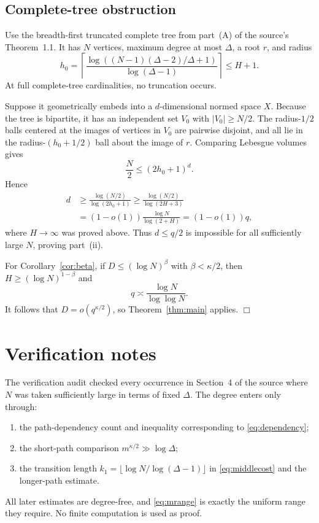\documentclass[11pt]{article}
\begin{document}
\subsection*{Complete-tree obstruction}

Use the breadth-first truncated complete tree from part~(A) of the source's
Theorem~1.1. It has $N$ vertices, maximum degree at most $\Delta$, a root $r$,
and radius
\[
 h_0=\left\lceil
 \frac{\log\left((N-1)(\Delta-2)/\Delta+1\right)}{\log(\Delta-1)}
 \right\rceil\leq H+1.
\]
At full complete-tree cardinalities, no truncation occurs.

Suppose it geometrically embeds into a $d$-dimensional normed space $X$.
Because the tree is bipartite, it has an independent set $V_0$ with
$|V_0|\geq N/2$. The radius-$1/2$ balls centered at the images of vertices in
$V_0$ are pairwise disjoint, and all lie in the radius-$(h_0+1/2)$ ball about
the image of $r$. Comparing Lebesgue volumes gives
\[
 \frac N2\leq(2h_0+1)^d.
\]
Hence
\begin{align*}
 d&\geq\frac{\log(N/2)}{\log(2h_0+1)}
 \geq\frac{\log(N/2)}{\log(2H+3)}\\
  &=(1-o(1))\frac{\log N}{\log(2+H)}=(1-o(1))q,
\end{align*}
where $H\to\infty$ was proved above. Thus $d\leq q/2$ is impossible for all
sufficiently large $N$, proving part~(ii).

For Corollary~\ref{cor:beta}, if
$D\leq(\log N)^\beta$ with $\beta<\kappa/2$, then
$H\geq(\log N)^{1-\beta}$ and
\[
 q\asymp\frac{\log N}{\log\log N}.
\]
It follows that $D=o(q^{\kappa/2})$, so Theorem~\ref{thm:main} applies.
\hfill$\Box$

\section*{Verification notes}

The verification audit checked every occurrence in Section~4 of the source
where $N$ was taken sufficiently large in terms of fixed $\Delta$.
The degree enters only through:
\begin{enumerate}
 \item the path-dependency count and inequality corresponding to
 \eqref{eq:dependency};
 \item the short-path comparison $m^{\kappa/2}\gg\log\Delta$;
 \item the transition length $k_1=\lfloor\log N/\log(\Delta-1)\rfloor$ in
 \eqref{eq:middlecost} and the longer-path estimate.
\end{enumerate}
All later estimates are degree-free, and \eqref{eq:mrange} is exactly the
uniform range they require. No finite computation is used as proof.
\end{document}

